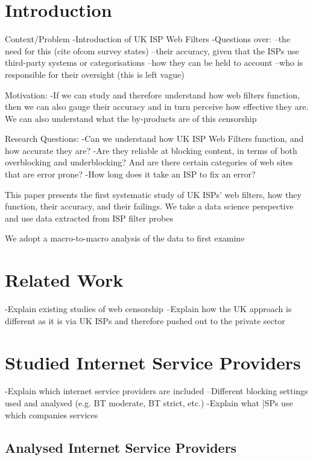 \documentclass{bmcart}
\begin{document}

\section*{Introduction}
Context/Problem
-Introduction of UK ISP Web Filters
-Questions over:
--the need for this (cite ofcom survey states)
--their accuracy, given that the ISPs use third-party systems or categorisations
--how they can be held to account
--who is responsible for their oversight (this is left vague)


Motivation:
-If we can study and therefore understand how web filters function, then we can also gauge their accuracy and in turn perceive how effective they are. We can also understand what the by-products are of this censorship

Research Questions:
-Can we understand how UK ISP Web Filters function, and how accurate they are?
-Are they reliable at blocking content, in terms of both overblocking and underblocking? And are there certain categories of web sites that are error prone?
-How long does it take an ISP to fix an error?

This paper presents the first systematic study of UK ISPs' web filters, how they function, their accuracy, and their failings.
We take a data science perspective and use data extracted from ISP filter probes

We adopt a macro-to-macro analysis of the data to first examine 




\section*{Related Work}
-Explain existing studies of web censorship
--Explain how the UK approach is different as it is via UK ISPs and therefore pushed out to the private sector

\section*{Studied Internet Service Providers}
-Explain which internet service providers are included
--Different blocking settings used and analysed (e.g. BT moderate, BT strict, etc.)
-Explain what |SPs use which companies services

\subsection*{Analysed Internet Service Providers}
\end{document}
